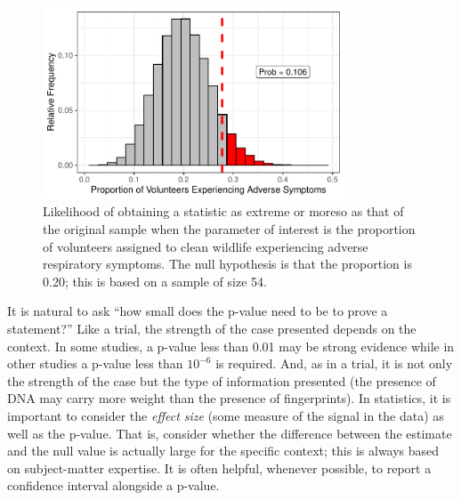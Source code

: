\documentclass[
  letterpaper,
  DIV=11,
  numbers=noendperiod]{scrreprt}
\theoremstyle{definition}
\theoremstyle{definition}
\theoremstyle{plain}
\theoremstyle{remark}
\begin{document}
\begin{figure}

{\centering \includegraphics[width=0.8\textwidth,height=\textheight]{./images/fig-nulldistns-deepwater-pvalue-1.pdf}

}

\caption{\label{fig-nulldistns-deepwater-pvalue}Likelihood of obtaining
a statistic as extreme or moreso as that of the original sample when the
parameter of interest is the proportion of volunteers assigned to clean
wildlife experiencing adverse respiratory symptoms. The null hypothesis
is that the proportion is 0.20; this is based on a sample of size 54.}

\end{figure}

It is natural to ask ``how small does the p-value need to be to prove a
statement?'' Like a trial, the strength of the case presented depends on
the context. In some studies, a p-value less than 0.01 may be strong
evidence while in other studies a p-value less than \(10^{-6}\) is
required. And, as in a trial, it is not only the strength of the case
but the type of information presented (the presence of DNA may carry
more weight than the presence of fingerprints). In statistics, it is
important to consider the \emph{effect size} (some measure of the signal
in the data) as well as the p-value. That is, consider whether the
difference between the estimate and the null value is actually large for
the specific context; this is always based on subject-matter expertise.
It is often helpful, whenever possible, to report a confidence interval
alongside a p-value.
\end{document}
